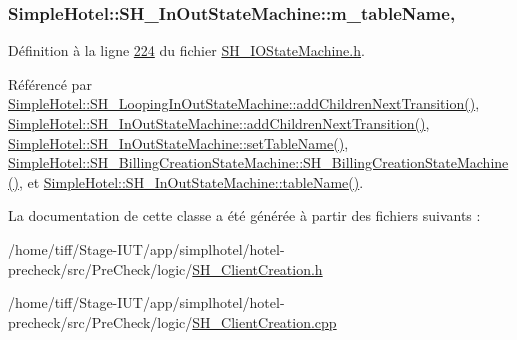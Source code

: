 \hypertarget{classSimpleHotel_1_1SH__InOutStateMachine_a15c063debdaa4c87bd4925867a13ce9e}{
\subsubsection[{m\-\_\-table\-Name}]{\setlength{\rightskip}{0pt plus 5cm}Simple\-Hotel\-::\-S\-H\-\_\-\-In\-Out\-State\-Machine\-::m\-\_\-table\-Name\hspace{0.3cm}{\ttfamily [protected]}, {\ttfamily [inherited]}}}\label{classSimpleHotel_1_1SH__InOutStateMachine_a15c063debdaa4c87bd4925867a13ce9e}


Définition à la ligne \hyperlink{SH__IOStateMachine_8h_source_l00224}{224} du fichier \hyperlink{SH__IOStateMachine_8h_source}{S\-H\-\_\-\-I\-O\-State\-Machine.\-h}.



Référencé par \hyperlink{classSimpleHotel_1_1SH__LoopingInOutStateMachine_a2ac2ff43d97fd1b12e1b30d6818f33e4}{Simple\-Hotel\-::\-S\-H\-\_\-\-Looping\-In\-Out\-State\-Machine\-::add\-Children\-Next\-Transition()}, \hyperlink{classSimpleHotel_1_1SH__InOutStateMachine_aaf5afe04d6e4d3d5ebf0b5f1b00eddf1}{Simple\-Hotel\-::\-S\-H\-\_\-\-In\-Out\-State\-Machine\-::add\-Children\-Next\-Transition()}, \hyperlink{classSimpleHotel_1_1SH__InOutStateMachine_adae23a212e9ba1e590f062994cd367a6}{Simple\-Hotel\-::\-S\-H\-\_\-\-In\-Out\-State\-Machine\-::set\-Table\-Name()}, \hyperlink{classSimpleHotel_1_1SH__BillingCreationStateMachine_a8c7d39e11d0ced1fd9c27a5550465b86}{Simple\-Hotel\-::\-S\-H\-\_\-\-Billing\-Creation\-State\-Machine\-::\-S\-H\-\_\-\-Billing\-Creation\-State\-Machine()}, et \hyperlink{classSimpleHotel_1_1SH__InOutStateMachine_a9fd170fd458e524ac0629b64d5323a45}{Simple\-Hotel\-::\-S\-H\-\_\-\-In\-Out\-State\-Machine\-::table\-Name()}.



La documentation de cette classe a été générée à partir des fichiers suivants \-:\begin{DoxyCompactItemize}
\item 
/home/tiff/\-Stage-\/\-I\-U\-T/app/simplhotel/hotel-\/precheck/src/\-Pre\-Check/logic/\hyperlink{SH__ClientCreation_8h}{S\-H\-\_\-\-Client\-Creation.\-h}\item 
/home/tiff/\-Stage-\/\-I\-U\-T/app/simplhotel/hotel-\/precheck/src/\-Pre\-Check/logic/\hyperlink{SH__ClientCreation_8cpp}{S\-H\-\_\-\-Client\-Creation.\-cpp}\end{DoxyCompactItemize}
